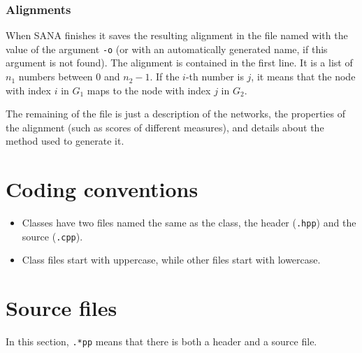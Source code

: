 \documentclass[]{article}
\begin{document}
\subsubsection*{Alignments}
When SANA finishes it saves the resulting alignment in the file named with the value of the argument \texttt{-o} (or with an automatically generated name, if this argument is not found). The alignment is contained in the first line. It is a list of $n_1$ numbers between $0$ and $n_2-1$. If the $i$-th number is $j$, it means that the node with index $i$ in $G_1$ maps to the node with index $j$ in $G_2$.

The remaining of the file is just a description of the networks, the properties of the alignment (such as scores of different measures), and details about the method used to generate it.

\section{Coding conventions}

\begin{itemize}
\item Classes have two files named the same as the class, the header (\texttt{.hpp}) and the source (\texttt{.cpp}).
\item Class files start with uppercase, while other files start with lowercase.
\end{itemize}


\section{Source files}
In this section, \texttt{.*pp} means that there is both a header and a source file.
\end{document}
